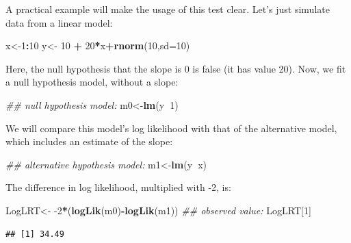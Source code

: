 \documentclass[12pt,]{krantz}
\newenvironment{Shaded}{\begin{snugshade}}{\end{snugshade}}
\newcommand{\CommentTok}[1]{\textcolor[rgb]{0.56,0.35,0.01}{\textit{#1}}}
\newcommand{\DataTypeTok}[1]{\textcolor[rgb]{0.13,0.29,0.53}{#1}}
\newcommand{\DecValTok}[1]{\textcolor[rgb]{0.00,0.00,0.81}{#1}}
\newcommand{\KeywordTok}[1]{\textcolor[rgb]{0.13,0.29,0.53}{\textbf{#1}}}
\newcommand{\NormalTok}[1]{#1}
\newcommand{\OperatorTok}[1]{\textcolor[rgb]{0.81,0.36,0.00}{\textbf{#1}}}
\newcommand{\StringTok}[1]{\textcolor[rgb]{0.31,0.60,0.02}{#1}}
\begin{document}
A practical example will make the usage of this test clear.
Let's just simulate data from a linear model:

\begin{Shaded}
\begin{Highlighting}[]
\NormalTok{x<-}\DecValTok{1}\OperatorTok{:}\DecValTok{10}
\NormalTok{y<-}\StringTok{ }\DecValTok{10} \OperatorTok{+}\StringTok{ }\DecValTok{20}\OperatorTok{*}\NormalTok{x}\OperatorTok{+}\KeywordTok{rnorm}\NormalTok{(}\DecValTok{10}\NormalTok{,}\DataTypeTok{sd=}\DecValTok{10}\NormalTok{)}
\end{Highlighting}
\end{Shaded}

Here, the null hypothesis that the slope is 0 is false (it has value 20). Now, we fit a null hypothesis model, without a slope:

\begin{Shaded}
\begin{Highlighting}[]
\CommentTok{## null hypothesis model:}
\NormalTok{m0<-}\KeywordTok{lm}\NormalTok{(y}\OperatorTok{~}\DecValTok{1}\NormalTok{)}
\end{Highlighting}
\end{Shaded}

We will compare this model's log likelihood with that of the alternative model, which includes an estimate of the slope:

\begin{Shaded}
\begin{Highlighting}[]
\CommentTok{## alternative hypothesis model:}
\NormalTok{m1<-}\KeywordTok{lm}\NormalTok{(y}\OperatorTok{~}\NormalTok{x)}
\end{Highlighting}
\end{Shaded}

The difference in log likelihood, multiplied with -2, is:

\begin{Shaded}
\begin{Highlighting}[]
\NormalTok{LogLRT<-}\StringTok{ }\DecValTok{-2}\OperatorTok{*}\NormalTok{(}\KeywordTok{logLik}\NormalTok{(m0)}\OperatorTok{-}\KeywordTok{logLik}\NormalTok{(m1))}
\CommentTok{## observed value:}
\NormalTok{LogLRT[}\DecValTok{1}\NormalTok{]}
\end{Highlighting}
\end{Shaded}

\begin{verbatim}
## [1] 34.49
\end{verbatim}
\end{document}
